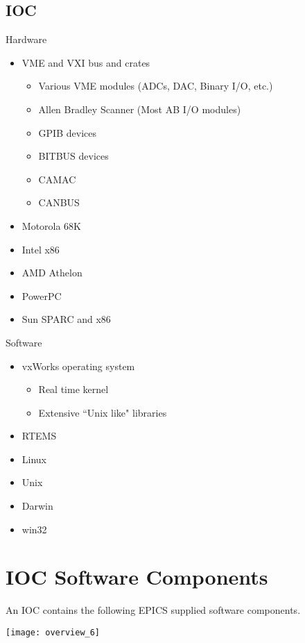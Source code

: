 \subsection{IOC}
Hardware
\begin{itemize}
\item VME and VXI bus and crates
  \begin{itemize}
  \item Various VME modules (ADCs, DAC, Binary I/O, etc.)
  \item Allen Bradley Scanner (Most AB I/O modules)
  \item GPIB devices
  \item BITBUS devices
  \item CAMAC
  \item CANBUS
  \end{itemize}
\item Motorola 68K
\item Intel x86
\item AMD Athelon
\item PowerPC
\item Sun SPARC and x86
\end{itemize}
Software
\begin{itemize}
\item vxWorks operating system
\begin{itemize}
\item Real time kernel
\item Extensive ``Unix like" libraries
\end{itemize}
\item RTEMS
\item Linux
\item Unix
\item Darwin
\item win32
\end{itemize}

\section{IOC Software Components}


An IOC contains the following EPICS supplied software components.
\begin{center}
\texttt{[image: overview\_6]}
\end{center}

